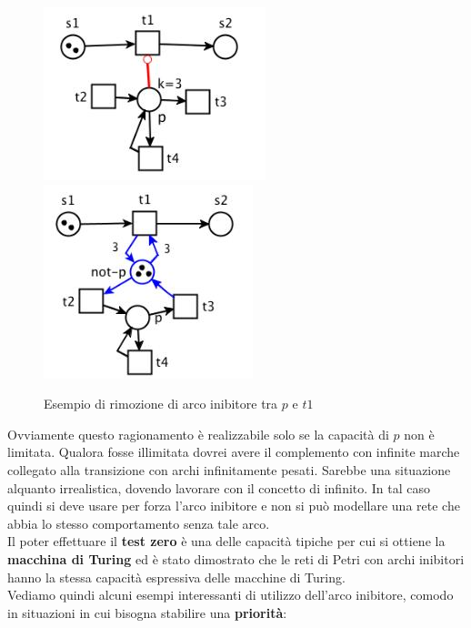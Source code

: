 \documentclass[a4paper,12pt, oneside]{book}
\begin{document}
\begin{figure}[H]
  \centering
  \includegraphics[scale = 0.7]{img/inib2.jpg}
  \includegraphics[scale = 0.7]{img/inib4.jpg}
  \caption{Esempio di rimozione di arco inibitore tra $p$ e $t1$}
\end{figure}
Ovviamente questo ragionamento è realizzabile solo se la capacità di $p$ non è
limitata. Qualora fosse illimitata dovrei avere il complemento con infinite
marche collegato alla transizione con archi infinitamente pesati. Sarebbe una
situazione alquanto irrealistica, dovendo lavorare con il concetto di infinito. 
In tal caso quindi si deve usare per forza l'arco inibitore e non si può
modellare una rete che abbia lo stesso comportamento senza tale arco.\\
Il poter effettuare il \textbf{test zero} è una delle capacità tipiche per cui
si ottiene la \textbf{macchina di Turing} ed è stato dimostrato che le reti di
Petri con archi inibitori hanno la stessa capacità espressiva delle macchine di
Turing.\\
Vediamo quindi alcuni esempi interessanti di utilizzo dell'arco inibitore,
comodo in situazioni in cui bisogna stabilire una \textbf{priorità}:
\end{document}
